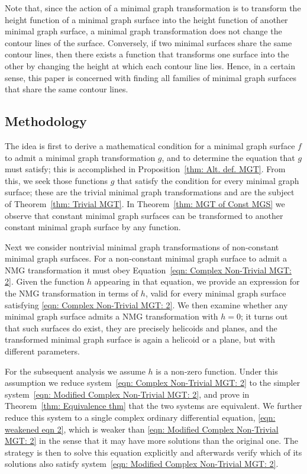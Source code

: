 \documentclass[12pt]{article}
\theoremstyle{plain}
\theoremstyle{definition}
\theoremstyle{remark}
\begin{document}
	 Note that, since the action of a minimal graph transformation is to transform the height function of a minimal graph surface into the height function of another minimal graph surface, a minimal graph transformation does not change the contour lines of the surface. Conversely, if two minimal surfaces share the same contour lines, then there exists a function that transforms one surface into the other by changing the height at which each contour line lies. Hence, in a certain sense, this paper is concerned with finding all families of minimal graph surfaces that share the same contour lines.  
	 
	 \subsection{Methodology}
	 The idea is first to derive a mathematical condition for a minimal graph surface \(f\) to admit a minimal graph transformation \(g\), and to determine the equation that \(g\) must satisfy; this is accomplished in Proposition~\ref{thm: Alt. def. MGT}. From this, we seek those functions \(g\) that satisfy the condition for every minimal graph surface; these are the trivial minimal graph transformations and are the subject of Theorem~\ref{thm: Trivial MGT}. In Theorem~\ref{thm: MGT of Const MGS} we observe that constant minimal graph surfaces can be transformed to another constant minimal graph surface by any function.
	 
	 Next we consider nontrivial minimal graph transformations of non‑constant minimal graph surfaces. For a non‑constant minimal graph surface to admit a NMG transformation it must obey Equation~\ref{eqn: Complex Non-Trivial MGT: 2}. Given the function \(h\) appearing in that equation, we provide an expression for the NMG transformation in terms of \(h\), valid for every minimal graph surface satisfying \ref{eqn: Complex Non-Trivial MGT: 2}. We then examine whether any minimal graph surface admits a NMG transformation with \(h=0\); it turns out that such surfaces do exist, they are precisely helicoids and planes, and the transformed minimal graph surface is again a helicoid or a plane, but with different parameters.
	 
	 For the subsequent analysis we assume \(h\) is a non‑zero function. Under this assumption we reduce system~\ref{eqn: Complex Non-Trivial MGT: 2} to the simpler system~\ref{eqn: Modified Complex Non-Trivial MGT: 2}, and prove in Theorem~\ref{thm: Equivalence thm} that the two systems are equivalent. We further reduce this system to a single complex ordinary differential equation, \ref{eqn: weakened eqn 2}, which is weaker than \ref{eqn: Modified Complex Non-Trivial MGT: 2} in the sense that it may have more solutions than the original one. The strategy is then to solve this equation explicitly and afterwards verify which of its solutions also satisfy system~\ref{eqn: Modified Complex Non-Trivial MGT: 2}. 
	 
\end{document}
